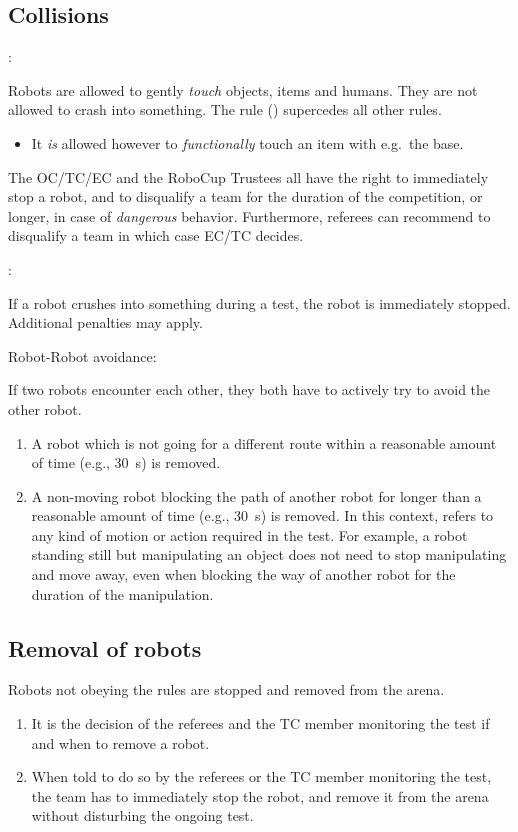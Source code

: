 \subsection{Collisions}
\begin{enumerate}
	{\bf\item {}:} Robots are allowed to gently \emph{touch} objects, items and humans. 	They are not allowed to crash into something. The  rule () supercedes all other rules.
	\begin{itemize}
		\item It \emph{is} allowed however to \emph{functionally} touch an item with e.g.~the base.
	\end{itemize}
	The OC/TC/EC and the RoboCup Trustees all have the right to immediately stop a robot, and to disqualify a team for the duration of the competition, or longer, in case of \emph{dangerous} behavior. Furthermore, referees can recommend to disqualify a team in which case EC/TC decides.
	{\bf\item {}:} If a robot crushes into something during a test, the robot is immediately stopped.	Additional penalties may apply. 
	{\bf\item Robot-Robot avoidance:} If two robots encounter each other, they both have to actively try to avoid the other robot.
	\begin{enumerate}
		\item A robot which is not going for a different route within a reasonable amount of time (e.g., \SI{30}{\second}) is removed.
		\item A non-moving robot blocking the path of another robot for longer than a reasonable amount of time (e.g., \SI{30}{\second}) is removed. In this context,  refers to any kind of motion or action required in the test. For example, a robot standing still but manipulating an object does not need to stop manipulating and move away, even when blocking the way of another robot for the duration of the manipulation.
	\end{enumerate}
\end{enumerate}



\subsection{Removal of robots}
\label{rule:robot_removal}
Robots not obeying the rules are stopped and removed from the arena.
\begin{enumerate}
	\item It is the decision of the referees and the TC member monitoring the test if and when to remove a robot.
	\item When told to do so by the referees or the TC member monitoring the test, the team has to immediately stop the robot, and remove it from the arena without disturbing the ongoing test.
\end{enumerate}


